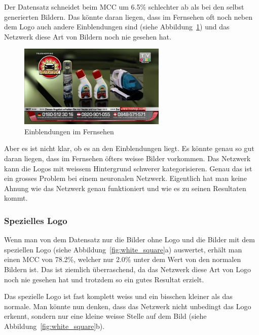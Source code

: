 \documentclass[12pt,a4paper]{report}
\begin{document}
Der Datensatz schneidet beim MCC um 6.5\% schlechter ab als bei den selbst generierten Bildern.
Das könnte daran liegen, dass im Fernsehen oft noch neben dem Logo auch andere Einblendungen sind (siehe Abbildung~\ref{fig:einblenden})
und das Netzwerk diese Art von Bildern noch nie gesehen hat.
\begin{figure}[h]%
    \centering
    \includegraphics[width=7cm]{assets/images/tv_einblenden.jpg}%
    \caption{Einblendungen im Fernsehen}%
    \label{fig:einblenden}%
\end{figure}
Aber es ist nicht klar, ob es an den Einblendungen liegt.
Es könnte genau so gut daran liegen,
dass im Fernsehen öfters weisse Bilder vorkommen.
Das Netzwerk kann die Logos mit weissem Hintergrund schwerer kategorisieren.
Genau das ist ein grosses Problem bei einem neuronalen Netzwerk.
Eigentlich hat man keine Ahnung wie das Netzwerk genau funktioniert und wie es zu seinen Resultaten kommt.
\subsubsection{Spezielles Logo}
Wenn man von dem Datensatz nur die Bilder ohne Logo und die Bilder mit dem speziellen Logo (siehe Abbildung~\ref{fig:white_square}a) auswertet,
erhält man einen MCC von 78.2\%, welcher nur 2.0\% unter dem Wert von den normalen Bildern ist.
Das ist ziemlich überraschend, da das Netzwerk diese Art von Logo noch nie gesehen hat und trotzdem so ein gutes Resultat erzielt.

Das spezielle Logo ist fast komplett weiss und ein bisschen kleiner als das normale.
Man könnte nun denken, dass das Netzwerk nicht unbedingt das Logo erkennt,
sondern nur eine kleine weisse Stelle auf dem Bild (siehe Abbildung~\ref{fig:white_square}b).
\end{document}
